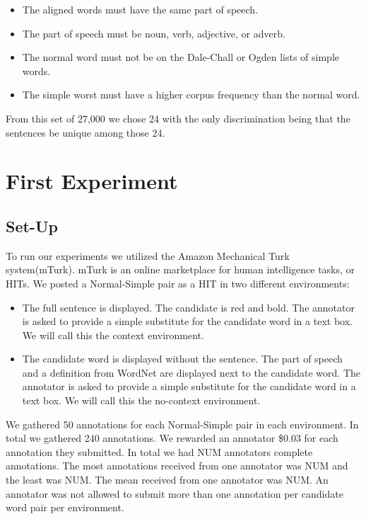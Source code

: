 \documentclass[11pt]{article}
\begin{document}
\begin{itemize}
\item The aligned words must have the same part of speech.
\item The part of speech must be noun, verb, adjective, or adverb.
\item The normal word must not be on the Dale-Chall or Ogden lists of simple words.
\item The simple worst must have a higher corpus frequency than the normal word.
\end{itemize}

From this set of 27,000 we chose 24 with the only discrimination being that the sentences be unique among those 24. 

\section{First Experiment}

\subsection{Set-Up}
To run our experiments we utilized the Amazon Mechanical Turk system(mTurk). mTurk is an online marketplace for human intelligence tasks, or HITs. We posted a Normal-Simple pair as a HIT in two different environments:

\begin{itemize}
\item The full sentence is displayed. The candidate is red and bold. The annotator is asked to provide a simple substitute for the candidate word in a text box. We will call this the context environment. 
\item The candidate word is displayed without the sentence. The part of speech and a definition from WordNet are displayed next to the candidate word. The annotator is asked to provide a simple substitute for the candidate word in a text box. We will call this the no-context environment.
\end{itemize}

We gathered 50 annotations for each Normal-Simple pair in each environment. In total we gathered 240 annotations. We rewarded an annotator \$0.03 for each annotation they submitted. In total we had NUM annotators complete annotations. The most annotations received from one annotator was NUM and the least was NUM. The mean received from one annotator was NUM. An annotator was not allowed to submit more than one annotation per candidate word pair per environment. 
\end{document}
